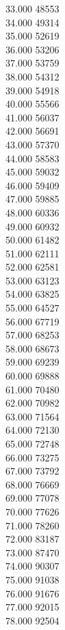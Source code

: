 { 33.000	48553 \\
 34.000	49314 \\
 35.000	52619 \\
 36.000	53206 \\
 37.000	53759 \\
 38.000	54312 \\
 39.000	54918 \\
 40.000	55566 \\
 41.000	56037 \\
 42.000	56691 \\
 43.000	57370 \\
 44.000	58583 \\
 45.000	59032 \\
 46.000	59409 \\
 47.000	59885 \\
 48.000	60336 \\
 49.000	60932 \\
 50.000	61482 \\
 51.000	62111 \\
 52.000	62581 \\
 53.000	63123 \\
 54.000	63825 \\
 55.000	64527 \\
 56.000	67719 \\
 57.000	68253 \\
 58.000	68673 \\
 59.000	69239 \\
 60.000	69888 \\
 61.000	70480 \\
 62.000	70982 \\
 63.000	71564 \\
 64.000	72130 \\
 65.000	72748 \\
 66.000	73275 \\
 67.000	73792 \\
 68.000	76669 \\
 69.000	77078 \\
 70.000	77626 \\
 71.000	78260 \\
 72.000	83187 \\
 73.000	87470 \\
 74.000	90307 \\
 75.000	91038 \\
 76.000	91676 \\
 77.000	92015 \\
 78.000	92504 \\
}
